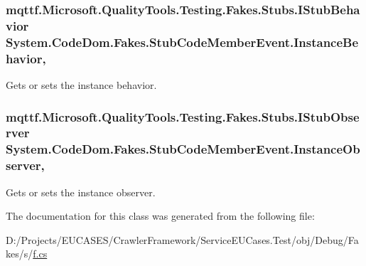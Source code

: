 \hypertarget{class_system_1_1_code_dom_1_1_fakes_1_1_stub_code_member_event_a28b6d0e897c989938bc7a29a5e4a1c30}{
\subsubsection[{Instance\-Behavior}]{\setlength{\rightskip}{0pt plus 5cm}mqttf.\-Microsoft.\-Quality\-Tools.\-Testing.\-Fakes.\-Stubs.\-I\-Stub\-Behavior System.\-Code\-Dom.\-Fakes.\-Stub\-Code\-Member\-Event.\-Instance\-Behavior\hspace{0.3cm}{\ttfamily [get]}, {\ttfamily [set]}}}\label{class_system_1_1_code_dom_1_1_fakes_1_1_stub_code_member_event_a28b6d0e897c989938bc7a29a5e4a1c30}


Gets or sets the instance behavior.

\hypertarget{class_system_1_1_code_dom_1_1_fakes_1_1_stub_code_member_event_ab3c0b54fe0c7a8182c1eae58c17522a2}{
\subsubsection[{Instance\-Observer}]{\setlength{\rightskip}{0pt plus 5cm}mqttf.\-Microsoft.\-Quality\-Tools.\-Testing.\-Fakes.\-Stubs.\-I\-Stub\-Observer System.\-Code\-Dom.\-Fakes.\-Stub\-Code\-Member\-Event.\-Instance\-Observer\hspace{0.3cm}{\ttfamily [get]}, {\ttfamily [set]}}}\label{class_system_1_1_code_dom_1_1_fakes_1_1_stub_code_member_event_ab3c0b54fe0c7a8182c1eae58c17522a2}


Gets or sets the instance observer.



The documentation for this class was generated from the following file\-:\begin{DoxyCompactItemize}
\item 
D\-:/\-Projects/\-E\-U\-C\-A\-S\-E\-S/\-Crawler\-Framework/\-Service\-E\-U\-Cases.\-Test/obj/\-Debug/\-Fakes/s/\hyperlink{s_2f_8cs}{f.\-cs}\end{DoxyCompactItemize}
